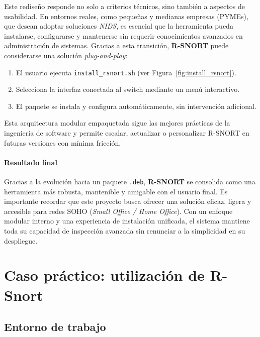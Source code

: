 \documentclass[11pt,a4paper,twoside]{report}
\begin{document}
Este rediseño responde no solo a criterios técnicos, sino también a aspectos de usabilidad. En entornos reales, como pequeñas y medianas empresas (PYMEs), que desean adoptar soluciones \textit{NIDS}, es esencial que la herramienta pueda instalarse, configurarse y mantenerse sin requerir conocimientos avanzados en administración de sistemas. Gracias a esta transición, \textbf{R-SNORT} puede considerarse una solución \textit{plug-and-play}:

\begin{enumerate}
	\item El usuario ejecuta \texttt{install\_rsnort.sh} (ver Figura~\ref{fig:install_rsnort}).
	\item Selecciona la interfaz conectada al switch mediante un menú interactivo.
	\item El paquete se instala y configura automáticamente, sin intervención adicional.
\end{enumerate}

Esta arquitectura modular empaquetada sigue las mejores prácticas de la ingeniería de software y permite escalar, actualizar o personalizar R-SNORT en futuras versiones con mínima fricción.

\pagebreak

\subsubsection{Resultado final}

Gracias a la evolución hacia un paquete \texttt{.deb}, \textbf{R-SNORT} se consolida como una herramienta más robusta, mantenible y amigable con el usuario final. Es importante recordar que este proyecto busca ofrecer una solución eficaz, ligera y accesible para redes SOHO (\textit{Small Office / Home Office}). Con un enfoque modular interno y una experiencia de instalación unificada, el sistema mantiene toda su capacidad de inspección avanzada sin renunciar a la simplicidad en su despliegue.



\chapter{Caso práctico: utilización de R-Snort}

\section{Entorno de trabajo}
\end{document}
